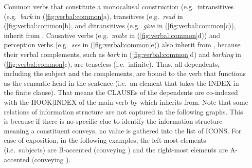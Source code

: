 Common verbs that constitute a monocalusal construction
(e.g.\ intransitives (e.g.\ \textit{bark} in
(\ref{fig:verbal:common}a), transitives (e.g.\ \textit{read} in
(\ref{fig:verbal:common}b), and ditransitives (e.g.\ \textit{give} in
(\ref{fig:verbal:common}c)), inherit from
. Causative verbs (e.g.\ \textit{make} in
(\ref{fig:verbal:common}d)) and perception verbs (e.g.\ \textit{see}
in (\ref{fig:verbal:common}e)) also inherit from
, because their verbal complements, such as
\textit{bark} in (\ref{fig:verbal:common}d) and \textit{barking} in
(\ref{fig:verbal:common}e), are tenseless (i.e.\ infinite).  Thus, all
dependents, including the subject and the complements, are bound to
the verb that functions as the semantic head in the sentence (i.e.\ an
element that takes the INDEX in the finite clause). That
means the CLAUSEs of the dependents are co-indexed with the
HOOK{$\mid$}INDEX of the main verb by
  which
 inherits from.  Note that some relations
of information structure are not captured in the following
graphs. This is because if there is no specific clue to identify the
information structure meaning a constituent conveys, no value is
gathered into the list of ICONS. For ease of exposition, in the
following examples, the left-most elements (i.e.\ subjects) are
B-accented (conveying ) and the right-most
elements are A-accented (conveying
).


